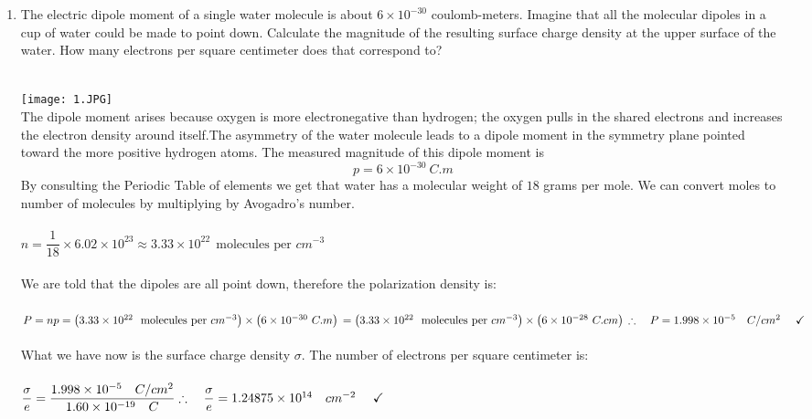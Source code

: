 \documentclass[fleqn]{article}
\begin{document}
  \begin{enumerate}
    \item The electric dipole moment of a single water molecule is about $6 \times 10^{-30}$ coulomb-meters. Imagine that all
    the molecular dipoles in a cup of water could be made to point down. Calculate the magnitude of the resulting surface charge 
    density at the upper surface of the water. How many electrons per square centimeter does that correspond to?

      \textcolor{hwColor}{
        \\
        \texttt{[image: 1.JPG]}
        \\
        The dipole moment arises because oxygen is more electronegative than hydrogen; the oxygen pulls in the shared electrons 
        and increases the electron density around itself.The asymmetry of the water molecule leads to a dipole moment in the symmetry 
        plane pointed toward the more positive hydrogen atoms. The measured magnitude of this dipole moment is
        $$
          p=6 \times 10^{-30} ~ C.m 
        $$
        By consulting the Periodic Table of elements we get that water has a molecular weight of $18$ grams per mole. 
        We can convert moles to number of molecules by multiplying by Avogadro’s number.
        \\
        \\
        $
          n=\dfrac{1}{18} \times 6.02 \times 10^{23} \approx 3.33 \times 10^{22} ~~ \text{molecules per $cm^{-3}$}
        $
        \\
        \\
        We are told that the dipoles are all point down, therefore the polarization density is:
        \\
        \\
        $
          P=np=\left(
            3.33 \times 10^{22} ~~ \text{molecules per $cm^{-3}$}
          \right) \times 
          \left(
            6 \times 10^{-30} ~ C.m 
          \right)
          \\
          \\
          =\left(
            3.33 \times 10^{22} ~~ \text{molecules per $cm^{-3}$}
          \right) \times 
          \left(
            6 \times 10^{-28} ~ C.cm 
          \right)
          \\
          \\
          \\
          \therefore ~~~ P=1.998 \times 10^{-5} ~~~ C/cm^2 ~~~~ \checkmark
        $
        \\
        \\
        What we have now is the surface charge density $\sigma$. The number of electrons per square centimeter is:
        \\
        \\
        $
          \dfrac{\sigma}{e}=\dfrac{1.998 \times 10^{-5} ~~~ C/cm^2}{1.60 \times 10^{-19} ~~~ C}
          \\
          \\
          \\
          \therefore ~~~ \dfrac{\sigma}{e}=1.24875 \times 10^{14} ~~~ cm^{-2} ~~~~ \checkmark
        $ 
      }


\end{enumerate}
\end{document}
